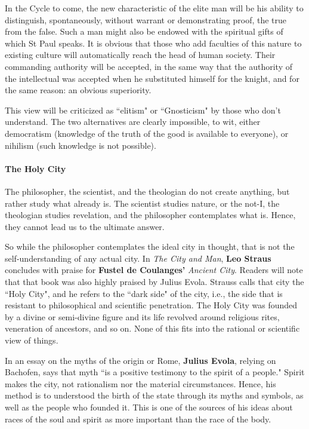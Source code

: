 \begin{quotex}
In the Cycle to come, the new characteristic of the elite man will be his ability to distinguish, spontaneously, without warrant or demonstrating proof, the true from the false. Such a man might also be endowed with the spiritual gifts of which St Paul speaks. It is obvious that those who add faculties of this nature to existing culture will automatically reach the head of human society. Their commanding authority will be accepted, in the same way that the authority of the intellectual was accepted when he substituted himself for the knight, and for the same reason: an obvious superiority. 

\end{quotex}
This view will be criticized as ``elitism" or ``Gnosticism" by those who don't understand. The two alternatives are clearly impossible, to wit, either democratism (knowledge of the truth of the good is available to everyone), or nihilism (such knowledge is not possible).

\paragraph{The Holy City}
The philosopher, the scientist, and the theologian do not create anything, but rather study what already is. The scientist studies nature, or the not-I, the theologian studies revelation, and the philosopher contemplates what is. Hence, they cannot lead us to the ultimate answer.

So while the philosopher contemplates the ideal city in thought, that is not the self-understanding of any actual city. In \emph{The City and Man}, \textbf{Leo Straus} concludes with praise for \textbf{Fustel de Coulanges'} \emph{Ancient City}. Readers will note that that book was also highly praised by Julius Evola. Strauss calls that city the ``Holy City", and he refers to the ``dark side" of the city, i.e., the side that is resistant to philosophical and scientific penetration. The Holy City was founded by a divine or semi-divine figure and its life revolved around religious rites, veneration of ancestors, and so on. None of this fits into the rational or scientific view of things.

In an essay on the myths of the origin or Rome, \textbf{Julius Evola}, relying on Bachofen, says that myth ``is a positive testimony to the spirit of a people." Spirit makes the city, not rationalism nor the material circumstances. Hence, his method is to understood the birth of the state through its myths and symbols, as well as the people who founded it. This is one of the sources of his ideas about races of the soul and spirit as more important than the race of the body.

